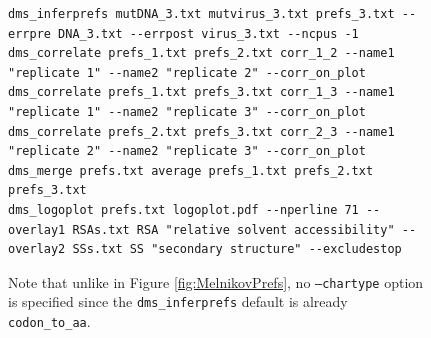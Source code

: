 \documentclass[twocolumn]{bmcart}%
\begin{document}
\begin{backmatter}
\begin{figure}[h!]
{\begin{lstlisting}
dms_inferprefs mutDNA_3.txt mutvirus_3.txt prefs_3.txt --errpre DNA_3.txt --errpost virus_3.txt --ncpus -1
dms_correlate prefs_1.txt prefs_2.txt corr_1_2 --name1 "replicate 1" --name2 "replicate 2" --corr_on_plot
dms_correlate prefs_1.txt prefs_3.txt corr_1_3 --name1 "replicate 1" --name2 "replicate 3" --corr_on_plot
dms_correlate prefs_2.txt prefs_3.txt corr_2_3 --name1 "replicate 2" --name2 "replicate 3" --corr_on_plot
dms_merge prefs.txt average prefs_1.txt prefs_2.txt prefs_3.txt
dms_logoplot prefs.txt logoplot.pdf --nperline 71 --overlay1 RSAs.txt RSA "relative solvent accessibility" --overlay2 SSs.txt SS "secondary structure" --excludestop
\end{lstlisting}
Note that unlike in Figure \ref{fig:MelnikovPrefs}, no \texttt{--chartype} option is specified since the \texttt{dms\_inferprefs} default is already \texttt{codon\_to\_aa}.
}
\end{figure}
      

\end{backmatter}
\end{document}
